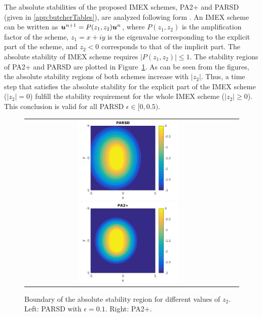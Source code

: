 The absolute stabilities of the proposed IMEX schemes,  PA2+ and PARSD (given in \ref{app:butcherTables}), are analyzed following form \cite{hu_etal_2017}.
An IMEX scheme can be written as $\boldsymbol{u}^{n+1} =P(z_1,z_2)\boldsymbol{u}^{n}$, where $P(z_1,z_2)$ is the amplification factor of the scheme, $z_1 = x +iy$ is the eigenvalue corresponding to the explicit part of the scheme, and $z_2 < 0$ corresponds to that of the implicit part.
The absolute stability of IMEX scheme requires $|P(z_1,z_2)|\leq 1$. 
The stability regions of PA2+ and PARSD are plotted in Figure~\ref{fig:AbsoluteStability}.
As can be seen from the figures, the absolute stability regions of both schemes increase with $|z_2|$.
Thus, a time step that satisfies the absolute stability for the explicit part of the IMEX scheme ($|z_2| = 0$) fulfill the stability requirement for the whole IMEX scheme ($|z_2| \geq 0$). 
This conclusion is valid for all PARSD $\epsilon\in [0,0.5)$.
\begin{figure}[h]
  \centering
  \begin{tabular}{cc}
    \includegraphics[width=0.5\textwidth]{figures/AbsoluteStabilityPARSD}
    \includegraphics[width=0.5\textwidth]{figures/AbsoluteStabilityPA2+}
  \end{tabular}
   \caption{Boundary of the absolute stability region for different values of $z_2$. Left: PARSD with $\epsilon = 0.1$. Right: PA2+.}
  \label{fig:AbsoluteStability}
\end{figure}